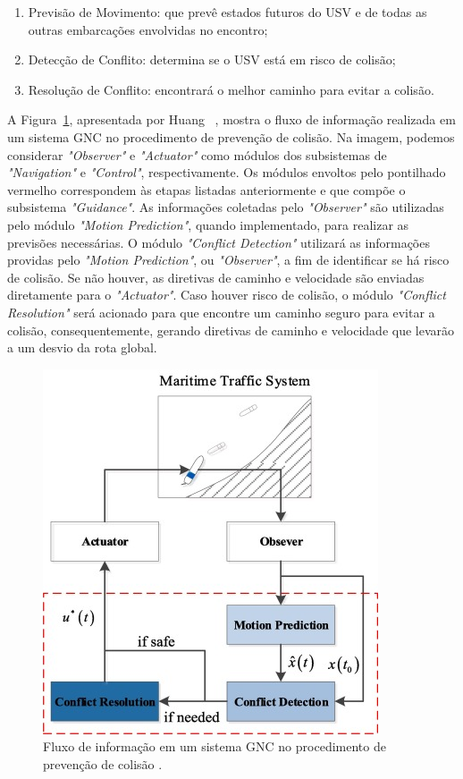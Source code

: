         \begin{enumerate}
            \item Previsão de Movimento: que prevê estados futuros do USV e de todas as outras embarcações envolvidas no encontro;
            \item Detecção de Conflito: determina se o USV está em risco de colisão;
            \item Resolução de Conflito: encontrará o melhor caminho para evitar a colisão.
        \end{enumerate}
        
        A Figura~\ref{fig:Huang2020_collisionAvoidanceProcess}, apresentada por Huang \etal~\cite{HUANG2020451}, mostra o fluxo de informação realizada em um sistema GNC no procedimento de prevenção de colisão. Na imagem, podemos considerar \textit{"Observer"} e \textit{"Actuator"} como módulos dos subsistemas de \textit{"Navigation"} e \textit{"Control"}, respectivamente. Os módulos envoltos pelo pontilhado vermelho correspondem às etapas listadas anteriormente e que compõe o subsistema \textit{"Guidance"}. As informações coletadas pelo \textit{"Observer"} são utilizadas pelo módulo \textit{"Motion Prediction"}, quando implementado, para realizar as previsões necessárias. O módulo \textit{"Conflict Detection"} utilizará as informações providas pelo \textit{"Motion Prediction"}, ou \textit{"Observer"}, a fim de identificar se há risco de colisão. Se não houver, as diretivas de caminho e velocidade são enviadas diretamente para o \textit{"Actuator"}. Caso houver risco de colisão, o módulo \textit{"Conflict Resolution"} será acionado para que encontre um caminho seguro para evitar a colisão, consequentemente, gerando diretivas de caminho e velocidade que levarão a um desvio da rota global.
        
        \begin{figure}[H]
            \centering
            \includegraphics{fig/chap2/information_flow.png}
            \caption{Fluxo de informação em um sistema GNC no procedimento de prevenção de colisão \cite{HUANG2020451}.}
            \label{fig:Huang2020_collisionAvoidanceProcess}
        \end{figure}
        

